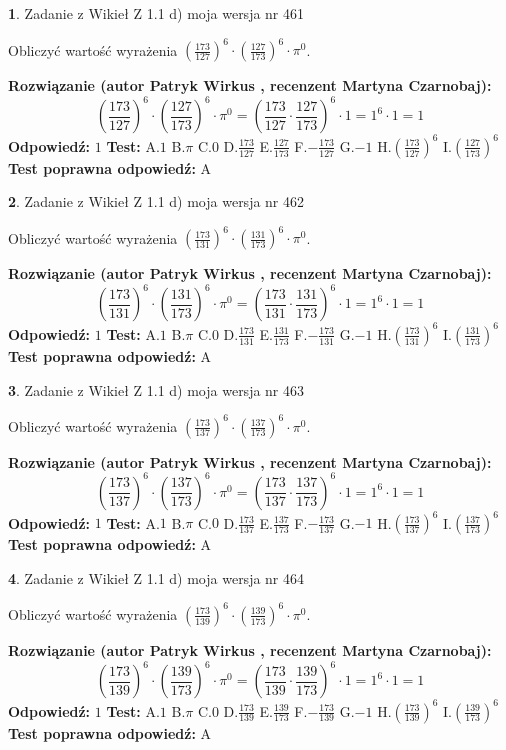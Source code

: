 \documentclass[12pt, a4paper]{article}
\theoremstyle{definition} %
\newtheorem{zad}{}
\newcommand{\zadStart}[1]{\begin{zad}#1\newline}
\newcommand{\zadStop}{\end{zad}}
\newcommand{\rozwStart}[2]{\noindent \textbf{Rozwiązanie (autor #1 , recenzent #2): }\newline}
\newcommand{\rozwStop}{\newline}
\newcommand{\odpStart}{\noindent \textbf{Odpowiedź:}\newline}
\newcommand{\odpStop}{\newline}
\newcommand{\testStart}{\noindent \textbf{Test:}\newline}
\newcommand{\testStop}{\newline}
\newcommand{\kluczStart}{\noindent \textbf{Test poprawna odpowiedź:}\newline}
\newcommand{\kluczStop}{\newline}
\begin{document}
\zadStart{Zadanie z Wikieł Z 1.1 d) moja wersja nr 461}

Obliczyć wartość wyrażenia $(\frac{173}{127})^{6} \cdot (\frac{127}{173})^{6} \cdot \pi^{0}$.
\zadStop
\rozwStart{Patryk Wirkus}{Martyna Czarnobaj}
$$(\frac{173}{127})^{6} \cdot (\frac{127}{173})^{6} \cdot \pi^{0} = (\frac{173}{127} \cdot \frac{127}{173})^{6} \cdot 1 = 1^{6} \cdot 1 = 1$$
\rozwStop
\odpStart
$1$
\odpStop
\testStart
A.$1$ B.$\pi$ C.$0$ D.$\frac{173}{127}$ E.$\frac{127}{173}$
F.$-\frac{173}{127}$ G.$-1$
H.$(\frac{173}{127})^{6}$
I.$(\frac{127}{173})^{6}$
\testStop
\kluczStart
A
\kluczStop



\zadStart{Zadanie z Wikieł Z 1.1 d) moja wersja nr 462}

Obliczyć wartość wyrażenia $(\frac{173}{131})^{6} \cdot (\frac{131}{173})^{6} \cdot \pi^{0}$.
\zadStop
\rozwStart{Patryk Wirkus}{Martyna Czarnobaj}
$$(\frac{173}{131})^{6} \cdot (\frac{131}{173})^{6} \cdot \pi^{0} = (\frac{173}{131} \cdot \frac{131}{173})^{6} \cdot 1 = 1^{6} \cdot 1 = 1$$
\rozwStop
\odpStart
$1$
\odpStop
\testStart
A.$1$ B.$\pi$ C.$0$ D.$\frac{173}{131}$ E.$\frac{131}{173}$
F.$-\frac{173}{131}$ G.$-1$
H.$(\frac{173}{131})^{6}$
I.$(\frac{131}{173})^{6}$
\testStop
\kluczStart
A
\kluczStop



\zadStart{Zadanie z Wikieł Z 1.1 d) moja wersja nr 463}

Obliczyć wartość wyrażenia $(\frac{173}{137})^{6} \cdot (\frac{137}{173})^{6} \cdot \pi^{0}$.
\zadStop
\rozwStart{Patryk Wirkus}{Martyna Czarnobaj}
$$(\frac{173}{137})^{6} \cdot (\frac{137}{173})^{6} \cdot \pi^{0} = (\frac{173}{137} \cdot \frac{137}{173})^{6} \cdot 1 = 1^{6} \cdot 1 = 1$$
\rozwStop
\odpStart
$1$
\odpStop
\testStart
A.$1$ B.$\pi$ C.$0$ D.$\frac{173}{137}$ E.$\frac{137}{173}$
F.$-\frac{173}{137}$ G.$-1$
H.$(\frac{173}{137})^{6}$
I.$(\frac{137}{173})^{6}$
\testStop
\kluczStart
A
\kluczStop



\zadStart{Zadanie z Wikieł Z 1.1 d) moja wersja nr 464}

Obliczyć wartość wyrażenia $(\frac{173}{139})^{6} \cdot (\frac{139}{173})^{6} \cdot \pi^{0}$.
\zadStop
\rozwStart{Patryk Wirkus}{Martyna Czarnobaj}
$$(\frac{173}{139})^{6} \cdot (\frac{139}{173})^{6} \cdot \pi^{0} = (\frac{173}{139} \cdot \frac{139}{173})^{6} \cdot 1 = 1^{6} \cdot 1 = 1$$
\rozwStop
\odpStart
$1$
\odpStop
\testStart
A.$1$ B.$\pi$ C.$0$ D.$\frac{173}{139}$ E.$\frac{139}{173}$
F.$-\frac{173}{139}$ G.$-1$
H.$(\frac{173}{139})^{6}$
I.$(\frac{139}{173})^{6}$
\testStop
\kluczStart
A
\kluczStop
\end{document}
